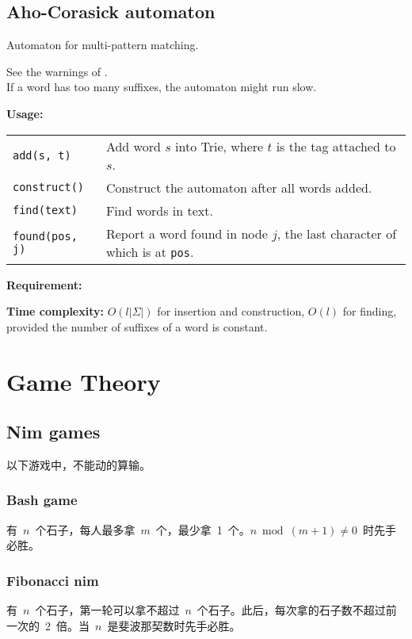 \subsection{Aho-Corasick automaton}
Automaton for multi-pattern matching. \par
\Warning See the warnings of . \\
\Warning If a word has too many suffixes, the automaton might run slow. \par
\textbf{Usage:} \\[0.1cm]
\begin{tabular}{p{2.5cm} p{9cm}}
  \lstinline|add(s, t)| & Add word $s$ into Trie, where $t$ is the tag attached to $s$.  \\
  \lstinline|construct()| & Construct the automaton after all words added. \\
  \lstinline|find(text)| & Find words in text. \\
  \lstinline|found(pos, j)| & Report a word found in node $j$, the last character of which is at \lstinline|pos|. \\
\end{tabular} \par
\textbf{Requirement:} \\
 \par
\textbf{Time complexity:} $O(l|\Sigma|)$ for insertion and construction, $O(l)$ for finding, provided the number of suffixes of a word is constant. \par


\section{Game Theory}
\subsection{Nim games}
以下游戏中，不能动的算输。
\subsubsection{Bash game}
有~$n$~个石子，每人最多拿~$m$~个，最少拿~1~个。$n \bmod (m+1) \neq 0$~时先手必胜。
\subsubsection{Fibonacci nim}
有~$n$~个石子，第一轮可以拿不超过~$n$~个石子。此后，每次拿的石子数不超过前一次的~2~倍。当~$n$~是斐波那契数时先手必胜。
